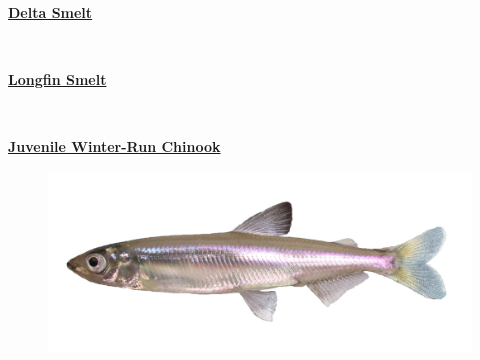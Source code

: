 \documentclass[
]{book}
\begin{document}
\begin{panel-grid}

\begin{columns-nocenter}

\begin{column800}

\textbf{\href{http://calfish.ucdavis.edu/species/?uid=47\&ds=698}{Delta Smelt}}

\end{column800}

\begin{column40}

~

\end{column40}

\begin{column800}

\textbf{\href{http://calfish.ucdavis.edu/species/?uid=87\&ds=698}{Longfin Smelt}}

\end{column800}

\begin{column40}

~

\end{column40}

\begin{column800}

\textbf{\href{http://calfish.ucdavis.edu/species/?uid=30\&ds=698}{Juvenile Winter-Run Chinook}}

\end{column800}

\end{columns-nocenter}

\begin{columns-nocenter}

\begin{column800}

\begin{figure}

{\centering \includegraphics[width=29.17in]{figures/delta_smelt} 

}
\end{figure}
\end{column800}
\end{columns-nocenter}
\end{panel-grid}
\end{document}
